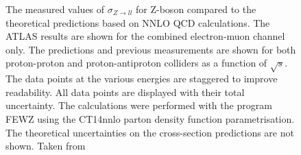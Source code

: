 \begin{figure}[!tbp]
\caption{The measured values of $\sigma_{Z \to ll}$ for Z-boson compared to the theoretical predictions based on NNLO QCD calculations. The ATLAS results are shown for the combined electron-muon channel only. The predictions and previous measurements are shown for both proton-proton and proton-antiproton colliders as a function of $\sqrt{s}$. The data points at the various energies are staggered to improve readability. All data points are displayed with their total uncertainty. The calculations were performed with the program FEWZ using the CT14nnlo parton density function parametrisation. The theoretical uncertainties on the cross-section predictions are not shown. Taken from \cite{a13TeV}}
\label{fig:Zcs}
\end{figure}

